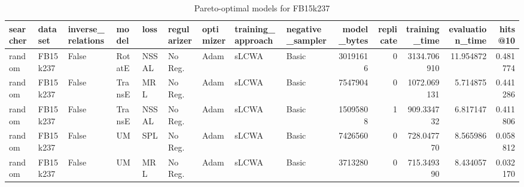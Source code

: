 \begin{table}
\centering
\caption{Pareto-optimal models for FB15k237}
\begin{tabular}{lllllllllrrrrr}
\toprule
searcher &   dataset & inverse\_relations &   model &   loss & regularizer & optimizer & training\_approach & negative\_sampler &  model\_bytes &  replicate &  training\_time &  evaluation\_time &   hits@10 \\
\midrule
  random &  FB15k237 &             False &  RotatE &  NSSAL &     No Reg. &      Adam &             sLCWA &            Basic &     30191616 &          0 &    3134.706910 &        11.954872 &  0.481774 \\
  random &  FB15k237 &             False &  TransE &    MRL &     No Reg. &      Adam &             sLCWA &            Basic &      7547904 &          0 &    1072.069131 &         5.714875 &  0.441286 \\
  random &  FB15k237 &             False &  TransE &  NSSAL &     No Reg. &      Adam &             sLCWA &            Basic &     15095808 &          1 &     909.334732 &         6.817147 &  0.411806 \\
  random &  FB15k237 &             False &      UM &    SPL &     No Reg. &      Adam &             sLCWA &            Basic &      7426560 &          0 &     728.047770 &         8.565986 &  0.058812 \\
  random &  FB15k237 &             False &      UM &    MRL &     No Reg. &      Adam &             sLCWA &            Basic &      3713280 &          0 &     715.349390 &         8.434057 &  0.032170 \\
\bottomrule
\end{tabular}
\end{table}

